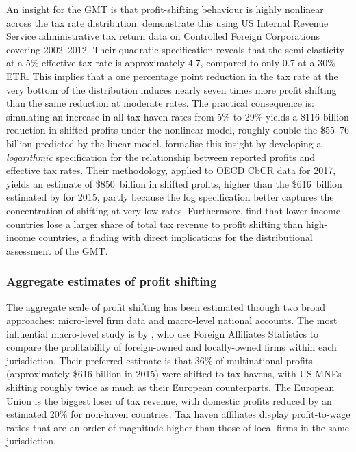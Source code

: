 \documentclass[11pt,a4paper]{article}
\begin{document}
An insight for the GMT is that profit-shifting behaviour is highly nonlinear across the tax rate distribution. \citet{dowd2017} demonstrate this using US Internal Revenue Service administrative tax return data on Controlled Foreign Corporations covering 2002--2012. Their quadratic specification reveals that the semi-elasticity at a 5\% effective tax rate is approximately 4.7, compared to only 0.7 at a 30\% ETR. This implies that a one percentage point reduction in the tax rate at the very bottom of the distribution induces nearly seven times more profit shifting than the same reduction at moderate rates. The practical consequence is: simulating an increase in all tax haven rates from 5\% to 29\% yields a \$116 billion reduction in shifted profits under the nonlinear model, roughly double the \$55--76 billion predicted by the linear model. \citet{garcia-bernardo2024} formalise this insight by developing a \emph{logarithmic} specification for the relationship between reported profits and effective tax rates. Their methodology, applied to OECD CbCR data for 2017, yields an estimate of \$850~billion in shifted profits, higher than the \$616~billion estimated by \citet{torslov2023} for 2015, partly because the log specification better captures the concentration of shifting at very low rates. Furthermore, \citet{garcia-bernardo2024} find that lower-income countries lose a larger share of total tax revenue to profit shifting than high-income countries, a finding with direct implications for the distributional assessment of the GMT.

\subsubsection{Aggregate estimates of profit shifting}

The aggregate scale of profit shifting has been estimated through two broad approaches: micro-level firm data and macro-level national accounts. The most influential macro-level study is by \citet{torslov2023}, who use Foreign Affiliates Statistics to compare the profitability of foreign-owned and locally-owned firms within each jurisdiction. Their preferred estimate is that 36\% of multinational profits (approximately \$616 billion in 2015) were shifted to tax havens, with US MNEs shifting roughly twice as much as their European counterparts. The European Union is the biggest loser of tax revenue, with domestic profits reduced by an estimated 20\% for non-haven countries. Tax haven affiliates display profit-to-wage ratios that are an order of magnitude higher than those of local firms in the same jurisdiction.
\end{document}
